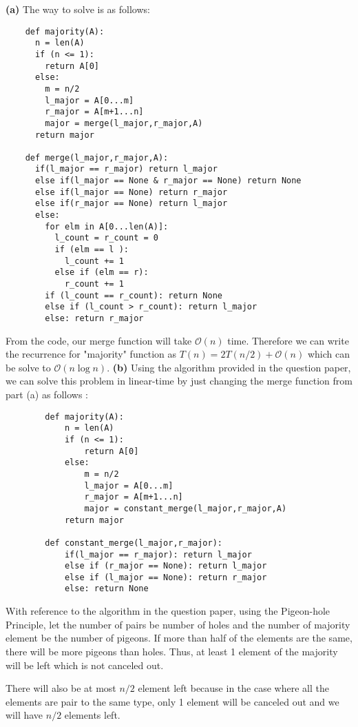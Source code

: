 \documentclass[a4paper, 12pt]{article}
\renewcommand{\part}[1] {\vspace{.10in} {\bf (#1)}}
\begin{document}
\part{a} The way to solve is as follows:
\begin{lstlisting}
	def majority(A):
	  n = len(A)
	  if (n <= 1):		
	    return A[0]
	  else:
	    m = n/2
	    l_major = A[0...m]
	    r_major = A[m+1...n]
	    major = merge(l_major,r_major,A)
	  return major
	
	def merge(l_major,r_major,A):
	  if(l_major == r_major) return l_major
	  else if(l_major == None & r_major == None) return None
	  else if(l_major == None) return r_major
	  else if(r_major == None) return l_major
	  else:
	    for elm in A[0...len(A)]:
	      l_count = r_count = 0
	      if (elm == l ):
	        l_count += 1
	      else if (elm == r):
	        r_count += 1
	    if (l_count == r_count): return None
	    else if (l_count > r_count): return l_major
	    else: return r_major
\end{lstlisting}
From the code, our merge function will take $\mathcal{O}(n)$ time. Therefore we can write the recurrence for "majority" function as $T(n) = 2T(n/2) + \mathcal{O}(n)$ which can be solve to $\mathcal{O}(n\log n)$.
\part{b} Using the algorithm provided in the question paper, we can solve this problem in linear-time by just changing the merge function from part (a) as follows :
\begin{lstlisting}
		def majority(A):
			n = len(A)
			if (n <= 1):		
				return A[0]
			else:
				m = n/2
				l_major = A[0...m]
				r_major = A[m+1...n]
				major = constant_merge(l_major,r_major,A)
			return major
		
		def constant_merge(l_major,r_major):
			if(l_major == r_major): return l_major
			else if (r_major == None): return l_major
			else if (l_major == None): return r_major
			else: return None
\end{lstlisting}
 With reference to the algorithm in the question paper, using the Pigeon-hole Principle, let the number of pairs be number of holes and the number of majority element be the number of pigeons. If more than half of the elements are the same, there will be more pigeons than holes. Thus, at least 1 element of the majority will be left which is not canceled out.
 
 There will also be at most $n/2$ element left because in the case where all the elements are pair to the same type, only 1 element will be canceled out and we will have $n/2$ elements left.
\end{document}

